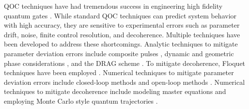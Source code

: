 QOC techniques have had tremendous success in
engineering high fidelity quantum gates \cite{
  chou2015optimal, dolde2014high, egger2013optimized, egger2014adaptive,
  grace2007optimal, heeres2017implementing, huang2014optimal,
  kelly2014optimal, leng2019robust, liebermann2016optimal,
  nebendahl2009optimal, rebentrost2009optimal, rebentrost2009optimal2,
  spiteri2018quantum, sporl2007optimal}. 
While standard QOC techniques can predict system behavior
with high accuracy, they are sensitive to experimental
errors such as parameter drift, noise, finite control 
resolution, and decoherence. Multiple techniques have been developed to address
these shortcomings. Analytic techniques to mitigate parameter deviation errors
include composite pulses \cite{cummins2000use, cummins2003tackling,
  kupce1995stretched, merrill2014progress},
dynamic and geometric phase considerations
\cite{han2020experimental, xu2020nonadiabatic},
and the DRAG scheme \cite{motzoi2009simple}.
To mitigate decoherence, Floquet techniques have been employed
\cite{huang2020engineering, mundada2020floquet}.
Numerical techniques to mitigate parameter deviation errors
include closed-loop methods \cite{egger2014adaptive, feng2018gradient, huang2020engineering,
  wittler2020integrated} and open-loop methods \cite{
  allen2019robust, carvalho2020error, reinhold2019controlling,
  rembold2020introduction, kosut2013robust}.
Numerical techniques to mitigate decoherence include
modeling master equations \cite{rembold2020introduction} and employing
Monte Carlo style quantum trajectories \cite{abdelhafez2019gradient}.

